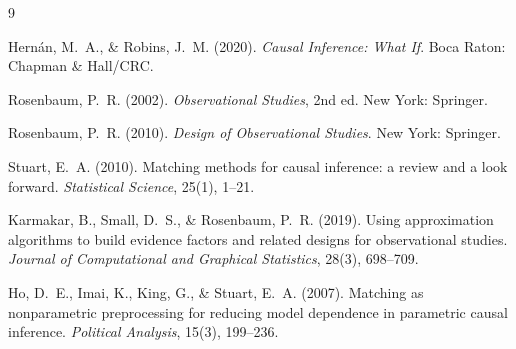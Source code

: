 \documentclass[11pt]{article}
\begin{document}
\begin{thebibliography}{9}

Hern\'an, M.~A., \& Robins, J.~M. (2020).
\textit{Causal Inference: What If}.
Boca Raton: Chapman \& Hall/CRC.

Rosenbaum, P.~R. (2002).
\textit{Observational Studies}, 2nd ed.
New York: Springer.

Rosenbaum, P.~R. (2010).
\textit{Design of Observational Studies}.
New York: Springer.

Stuart, E.~A. (2010).
Matching methods for causal inference: a review and a look forward.
\textit{Statistical Science}, 25(1), 1--21.

Karmakar, B., Small, D.~S., \& Rosenbaum, P.~R. (2019).
Using approximation algorithms to build evidence factors and related
designs for observational studies.
\textit{Journal of Computational and Graphical Statistics}, 28(3),
698--709.

Ho, D.~E., Imai, K., King, G., \& Stuart, E.~A. (2007).
Matching as nonparametric preprocessing for reducing model dependence in
parametric causal inference.
\textit{Political Analysis}, 15(3), 199--236.

\end{thebibliography}
\end{document}
